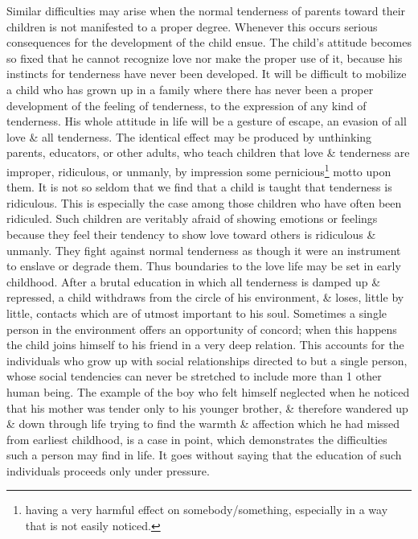 \documentclass{article}
\begin{document}
Similar difficulties may arise when the normal tenderness of parents toward their children is not manifested to a proper degree. Whenever this occurs serious consequences for the development of the child ensue. The child's attitude becomes so fixed that he cannot recognize love nor make the proper use of it, because his instincts for tenderness have never been developed. It will be difficult to mobilize a child who has grown up in a family where there has never been a proper development of the feeling of tenderness, to the expression of any kind of tenderness. His whole attitude in life will be a gesture of escape, an evasion of all love \& all tenderness. The identical effect may be produced by unthinking parents, educators, or other adults, who teach children that love \& tenderness are improper, ridiculous, or unmanly, by impression some pernicious\footnote{having a very harmful effect on somebody/something, especially in a way that is not easily noticed.} motto upon them. It is not so seldom that we find that a child is taught that tenderness is ridiculous. This is especially the case among those children who have often been ridiculed. Such children are veritably afraid of showing emotions or feelings because they feel their tendency to show love toward others is ridiculous \& unmanly. They fight against normal tenderness as though it were an instrument to enslave or degrade them. Thus boundaries to the love life may be set in early childhood. After a brutal education in which all tenderness is damped up \& repressed, a child withdraws from the circle of his environment, \& loses, little by little, contacts which are of utmost important to his soul. Sometimes a single person in the environment offers an opportunity of concord; when this happens the child joins himself to his friend in a very deep relation. This accounts for the individuals who grow up with social relationships directed to but a single person, whose social tendencies can never be stretched to include more than 1 other human being. The example of the boy who felt himself neglected when he noticed that his mother was tender only to his younger brother, \& therefore wandered up \& down through life trying to find the warmth \& affection which he had missed from earliest childhood, is a case in point, which demonstrates the difficulties such a person may find in life. It goes without saying that the education of such individuals proceeds only under pressure.
\end{document}
